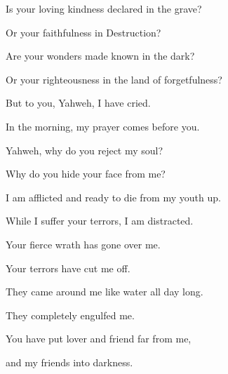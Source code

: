 {\Q {}Is your loving kindness declared in the grave?
\par }{\QB Or your faithfulness in Destruction?
\par }{\Q {}Are your wonders made known in the dark?
\par }{\QB Or your righteousness in the land of forgetfulness?
\par }{\Q {}But to you, Yahweh, I have cried.
\par }{\QB In the morning, my prayer comes before you.
\par }{\Q {}Yahweh, why do you reject my soul?
\par }{\QB Why do you hide your face from me?
\par }{\Q {}I am afflicted and ready to die from my youth up.
\par }{\QB While I suffer your terrors, I am distracted.
\par }{\Q {}Your fierce wrath has gone over me.
\par }{\QB Your terrors have cut me off.
\par }{\Q {}They came around me like water all day long.
\par }{\QB They completely engulfed me.
\par }{\Q {}You have put lover and friend far from me,
\par }{\QB and my friends into darkness.

\par }

